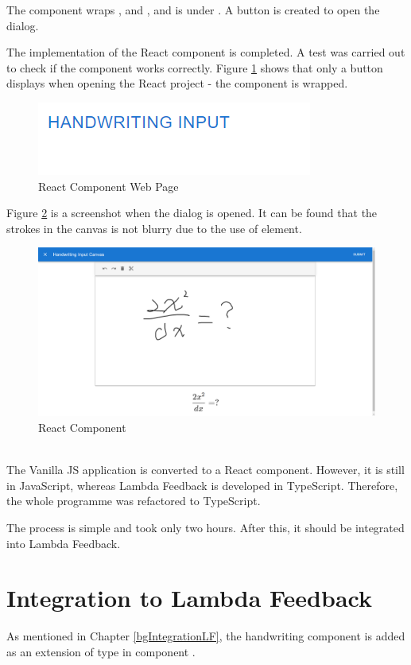 \documentclass[12pt,twoside]{report}
\begin{document}
The  component wraps ,  and , and is under . A button is created to open the dialog.

The implementation of the React component is completed. A test was carried out
to check if the component works correctly. Figure
\ref{fig:react-component-webpage} shows that only a button displays when opening the React project - the component is wrapped.
\begin{figure}[h]
    \centering
    \includegraphics[width=0.4\linewidth, frame]{figures/react-component-button.png}
    \caption{React Component Web Page}
    \label{fig:react-component-webpage}
\end{figure}

Figure \ref{fig:react-component-dialog} is a screenshot when the dialog is
opened. It can be found that the strokes in the canvas is not blurry due to the
use of  element.
\begin{figure}[h]
    \centering
    \includegraphics[width=\linewidth, frame]{figures/react-component-dialog.png}
    \caption{React Component}
    \label{fig:react-component-dialog}
\end{figure}
\\

The Vanilla JS application is converted to a React component. However, it is still in JavaScript, whereas Lambda Feedback is developed in TypeScript. Therefore, the whole programme was refactored to TypeScript. 

The process is simple and took only two hours. After this, it should be integrated into Lambda Feedback.

\section{Integration to Lambda Feedback}
As mentioned in Chapter \ref{bgIntegrationLF}, the handwriting component is added as an extension of type  in component . 
\end{document}
